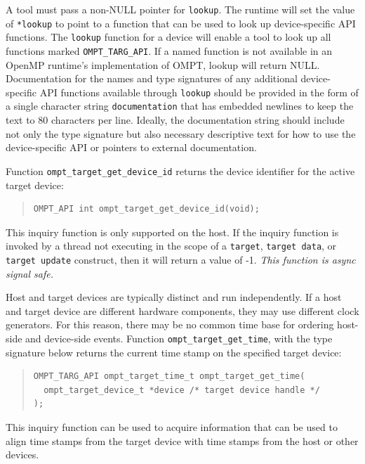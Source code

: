 \documentclass{article}
\begin{document}
A tool must pass a non-NULL pointer for \verb|lookup|.  The runtime will set the value of \verb|*lookup| to point to a function that can be used to look up device-specific API functions.  The \verb|lookup| function for a device will enable a tool to look up all functions marked \verb|OMPT_TARG_API|.  If a named function is not available in an OpenMP runtime's implementation of OMPT, lookup will return NULL. Documentation for the names and type signatures of any additional device-specific API functions available through \verb|lookup| should be provided in the form of a single character string \verb|documentation| that has embedded newlines to keep the text to 80 characters per line. Ideally, the documentation string should include not only the type signature but also necessary descriptive text for how to use the device-specific API or pointers to external documentation.

Function \verb|ompt_target_get_device_id| returns the device identifier for the active target device:
\begin{quote}
\begin{verbatim}
OMPT_API int ompt_target_get_device_id(void);
\end{verbatim}
\end{quote}
This inquiry function is only supported on the host. If the inquiry function is invoked by a thread not executing in the scope of a {\tt target}, {\tt target data}, or {\tt target update} construct, then it will return a value of -1. {\it This function is async signal safe.}

Host and target devices are typically distinct and run independently. If a
host and target device are different hardware components, they may 
use different clock generators. For this reason,  there may be no common time base for ordering host-side and device-side events.
Function \verb|ompt_target_get_time|, with the type signature below returns the current time stamp on the specified target device:
\begin{quote}
\begin{verbatim}
OMPT_TARG_API ompt_target_time_t ompt_target_get_time(
  ompt_target_device_t *device /* target device handle */
);
\end{verbatim}
\end{quote}
This inquiry function can be used
to acquire information that can be used to align time stamps from the target device with time
stamps from the host or other devices.
\end{document}
